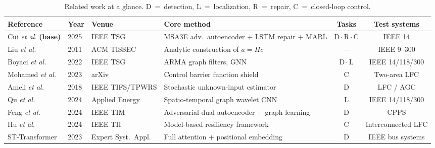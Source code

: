 %
%
%


\begin{table}[!t]
\caption{Related work at a glance. D~=~detection, L~=~localization,
R~=~repair, C~=~closed-loop control.}
\label{tab:related}
\centering
\begin{tabular}{@{}llllcc@{}}
\toprule
Reference & Year & Venue & Core method & Tasks & Test systems \\
\midrule
Cui \textit{et al.} \cite{cui2025} \textbf{(base)} & 2025 & IEEE TSG
  & MSA3E adv.\ autoencoder + LSTM repair + MARL & D\,$\cdot$\,R\,$\cdot$\,C & IEEE 14 \\
Liu \textit{et al.} \cite{liu2011} & 2011 & ACM TISSEC
  & Analytic construction of $a=Hc$ & --- & IEEE 9--300 \\
Boyaci \textit{et al.} \cite{boyaci2022} & 2022 & IEEE TSG
  & ARMA graph filters, GNN & D\,$\cdot$\,L & IEEE 14/118/300 \\
Mohamed \textit{et al.} \cite{mohamed2023} & 2023 & arXiv
  & Control barrier function shield & C & Two-area LFC \\
Ameli \textit{et al.} \cite{ameli2018} & 2018 & IEEE TIFS/TPWRS
  & Stochastic unknown-input estimator & D & LFC / AGC \\
Qu \textit{et al.} \cite{qu2024} & 2024 & Applied Energy
  & Spatio-temporal graph wavelet CNN & L & IEEE 14/118/300 \\
Feng \textit{et al.} \cite{feng2024} & 2024 & IEEE TIM
  & Adversarial dual autoencoder + graph learning & D & CPPS \\
Hu \textit{et al.} \cite{hu2024} & 2024 & IEEE TII
  & Model-based resiliency framework & C & Interconnected LFC \\
ST-Transformer \cite{sttrans2023} & 2023 & Expert Syst.\ Appl.
  & Full attention + positional embedding & D & IEEE bus systems \\

\end{tabular}
\end{table}
